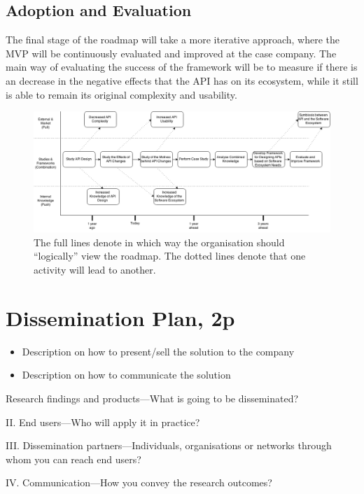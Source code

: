 \documentclass{article}
\begin{document}
\subsection{Adoption and Evaluation}
The final stage of the roadmap will take a more iterative approach, where the MVP will be continuously evaluated and improved at the case company. The main way of evaluating the success of the framework will be to measure if there is an decrease in the negative effects that the API has on its ecosystem, while it still is able to remain its original complexity and usability. 


\begin{figure}
\centering
\includegraphics[width=220mm]{RoadMap.png}
\caption{The full lines denote in which way the organisation should ``logically'' view the roadmap. The dotted lines denote that one activity will lead to another. }
\label{fig:roadmap}
\end{figure}

\section{Dissemination Plan, 2p}

\begin{itemize}
	\item Description on how to present/sell the solution to the company
	\item Description on how to communicate the solution
\end{itemize}


Research findings and products—What is going to be disseminated?

II.
End users—Who will apply it in practice?

III.
Dissemination partners—Individuals, organisations or networks through whom you can reach end users?

IV.
Communication—How you convey the research outcomes?
\end{document}
